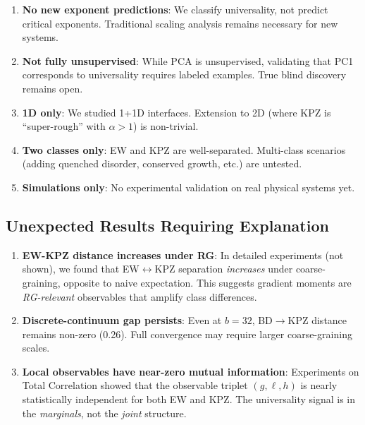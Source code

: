 \documentclass[aps,pre,twocolumn,superscriptaddress,showpacs,longbibliography]{revtex4-2}
\begin{document}
\begin{enumerate}
\item \textbf{No new exponent predictions}: We classify universality, not predict critical exponents. Traditional scaling analysis remains necessary for new systems.

\item \textbf{Not fully unsupervised}: While PCA is unsupervised, validating that PC1 corresponds to universality requires labeled examples. True blind discovery remains open.

\item \textbf{1D only}: We studied 1+1D interfaces. Extension to 2D (where KPZ is ``super-rough'' with $\alpha > 1$) is non-trivial.

\item \textbf{Two classes only}: EW and KPZ are well-separated. Multi-class scenarios (adding quenched disorder, conserved growth, etc.) are untested.

\item \textbf{Simulations only}: No experimental validation on real physical systems yet.
\end{enumerate}

\subsection{Unexpected Results Requiring Explanation}

\begin{enumerate}
\item \textbf{EW-KPZ distance increases under RG}: In detailed experiments (not shown), we found that EW$\leftrightarrow$KPZ separation \emph{increases} under coarse-graining, opposite to naive expectation. This suggests gradient moments are \emph{RG-relevant} observables that amplify class differences.

\item \textbf{Discrete-continuum gap persists}: Even at $b = 32$, BD$\to$KPZ distance remains non-zero (0.26). Full convergence may require larger coarse-graining scales.

\item \textbf{Local observables have near-zero mutual information}: Experiments on Total Correlation showed that the observable triplet $(g, \ell, h)$ is nearly statistically independent for both EW and KPZ. The universality signal is in the \emph{marginals}, not the \emph{joint} structure.
\end{enumerate}
\end{document}
